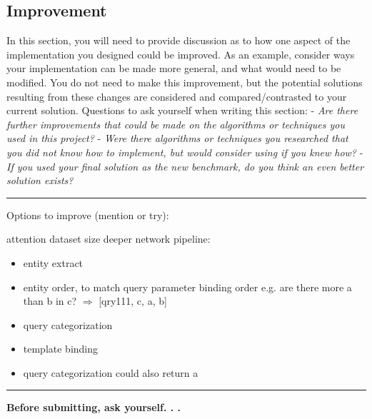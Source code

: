 \documentclass[12pt]{article}
\begin{document}
\subsection{Improvement}\label{improvement}

In this section, you will need to provide discussion as to how one
aspect of the implementation you designed could be improved. As an
example, consider ways your implementation can be made more general, and
what would need to be modified. You do not need to make this
improvement, but the potential solutions resulting from these changes
are considered and compared/contrasted to your current solution.
Questions to ask yourself when writing this section: - \emph{Are there
further improvements that could be made on the algorithms or techniques
you used in this project?} - \emph{Were there algorithms or techniques
you researched that you did not know how to implement, but would
consider using if you knew how?} - \emph{If you used your final solution
as the new benchmark, do you think an even better solution exists?}

\begin{center}\rule{0.5\linewidth}{\linethickness}\end{center}

Options to improve (mention or try):

attention
dataset size
deeper network
pipeline:
\begin{itemize}
\item entity extract
\item entity order, to match query parameter binding order e.g.
are there more a than b in c? \(\Rightarrow\) [qry111, c, a, b]
\item query categorization 
\item template binding
\item query categorization could also return a 
\end{itemize}

\begin{center}\rule{0.5\linewidth}{\linethickness}\end{center}

\textbf{Before submitting, ask yourself. . .}
\end{document}
